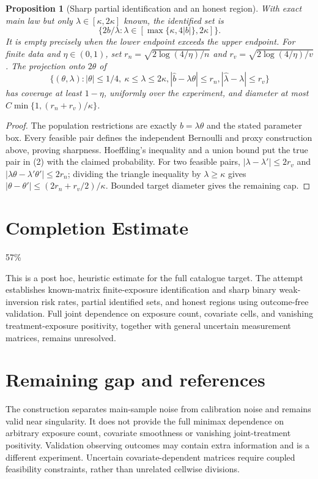 \documentclass[11pt,a4paper]{article}
\newtheorem{proposition}[theorem]{Proposition}
\theoremstyle{definition}
\theoremstyle{remark}
\begin{document}
\begin{proposition}[Sharp partial identification and an honest region]
With exact main law but only $\lambda\in[\kappa,2\kappa]$ known, the identified set is
\[
 \{2b/\lambda:\lambda\in[\max\{\kappa,4|b|\},2\kappa]\}.
\]
It is empty precisely when the lower endpoint exceeds the upper endpoint. For finite data and $\eta\in(0,1)$, set
$r_n=\sqrt{2\log(4/\eta)/n}$ and $r_v=\sqrt{2\log(4/\eta)/v}$. The projection onto $2\theta$ of
\[
 \{(\theta,\lambda):|\theta|\leq1/4,\ \kappa\leq\lambda\leq2\kappa,
 |\widehat b-\lambda\theta|\leq r_n,
 |\widehat\lambda-\lambda|\leq r_v\}\tag{2}
\]
has coverage at least $1-\eta$, uniformly over the experiment, and diameter at most $C\min\{1,(r_n+r_v)/\kappa\}$.
\end{proposition}
\begin{proof}
The population restrictions are exactly $b=\lambda\theta$ and the stated parameter box. Every feasible pair defines the independent Bernoulli and proxy construction above, proving sharpness. Hoeffding's inequality and a union bound put the true pair in (2) with the claimed probability. For two feasible pairs, $|\lambda-\lambda'|\leq2r_v$ and $|\lambda\theta-\lambda'\theta'|\leq2r_n$; dividing the triangle inequality by $\lambda\geq\kappa$ gives $|\theta-\theta'|\leq(2r_n+r_v/2)/\kappa$. Bounded target diameter gives the remaining cap.
\end{proof}

\section{Completion Estimate}
57\%

This is a post hoc, heuristic estimate for the full catalogue target.
The attempt establishes known-matrix finite-exposure identification and sharp binary weak-inversion risk rates, partial identified sets, and honest regions using outcome-free validation. Full joint dependence on exposure count, covariate cells, and vanishing treatment-exposure positivity, together with general uncertain measurement matrices, remains unresolved.

\section{Remaining gap and references}
The construction separates main-sample noise from calibration noise and remains valid near singularity. It does not provide the full minimax dependence on arbitrary exposure count, covariate smoothness or vanishing joint-treatment positivity. Validation observing outcomes may contain extra information and is a different experiment. Uncertain covariate-dependent matrices require coupled feasibility constraints, rather than unrelated cellwise divisions.
\end{document}
